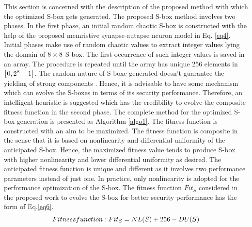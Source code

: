 \documentclass[journal]{IEEEtran/IEEEtran}
\begin{document}
This section is concerned with the description of the proposed method with which the optimized S-box gets generated. The proposed S-box method involves two phases. In the first phase, an initial random chaotic S-box is constructed with the help of the proposed memristive synapse-autapse neuron model in Eq. \ref{eq4}. Initial phases make use of random chaotic values to extract integer values lying the domain of ${\rm{8}} \times {\rm{8}}$  S-box. The first occurrence of such integer values is saved in an array. The procedure is repeated until the array has unique 256 elements in  $\left[ {0,{\rm{ }}{2^8} - 1} \right]$. The random nature of S-boxe generated doesn’t guarantee the yielding of strong components \cite{ahmad2018random}. Hence, it is advisable to have some mechanism which can evolve the S-boxes in terms of its security performance. Therefore, an intelligent heuristic is suggested which has the credibility to evolve the composite fitness function in the second phase. The complete method for the optimized S-box generation is presented as Algorithm \ref{algo1}. The fitness function is constructed with an aim to be maximized. The fitness function is composite in the sense that it is based on nonlinearity and differential uniformity of the anticipated S-box. Hence, the maximized fitness value tends to produce S-box with higher nonlinearity and lower differential uniformity as desired. The anticipated fitness function is unique and different as it involves two performance parameters instead of just one. In practice, only nonlinearity is adopted for the performance optimization of the S-box. The fitness function $Fi{t_S}$  considered in the proposed work to evolve the S-box for better security performance has the form of Eq.\ref{eq6}.
\begin{equation}\label{eq6}
Fitness{\rm{ }}function:{\rm{  }}Fi{t_S} = NL(S) + 256 - DU(S)
\end{equation}
\end{document}
